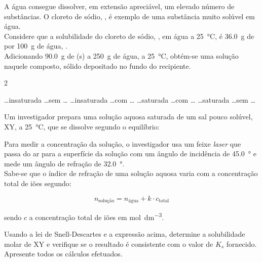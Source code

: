 \documentclass[addpoints, answers]{exam}
\begin{document}
\begin{questions}
		\question[8] A água consegue dissolver, em extensão apreciável, um elevado número de substâncias. O cloreto de sódio, , é exemplo de uma substância muito solúvel em água.\\
		
		Considere que a solubilidade do cloreto de sódio, , em água a \SI{25}{\celsius}, é \SI{36,0}{\gram} de  por \SI{100}{\gram} de água, .\\
		Adicionando \SI{90,0}{\gram} de (s) a \SI{250}{\gram} de água, a \SI{25}{\celsius}, obtém-se uma solução \underline{\hspace{50pt}} naquele composto, \underline{\hspace{50pt}} sólido depositado no fundo do recipiente.
		
		\begin{multicols}{2}
			\begin{randomizechoices}
				\choice \ldots insaturada \ldots sem \ldots
				\choice \ldots insaturada \ldots com \ldots
				\choice \ldots saturada \ldots com \ldots
				\correctchoice \ldots saturada \ldots sem \ldots
			\end{randomizechoices}
		\end{multicols}
		
		
		\question[16] Um investigador prepara uma solução aquosa saturada de um sal pouco solúvel, XY, a \SI{25}{\celsius}, que se dissolve segundo o equilíbrio:\\
		
		\begin{center}
		\end{center}
		
		Para medir a concentração da solução, o investigador usa um feixe \textit{laser} que passa do ar para a superfície da solução com um ângulo de incidência de \SI{45,0}{\degree} e mede um ângulo de refração de \SI{32,0}{\degree}.\\
		
		Sabe-se que o índice de refração de uma	solução aquosa varia com a concentração total de iões segundo:
		
		\[
		n_{\text{solução}} = n_{\text{água}} + k \cdot c_\text{total}
		\]
		
		sendo $c$ a concentração total de iões em \unit{\mole\per\cubic\deci\meter}.
		
		Usando a lei de Snell-Descartes e a expressão acima, determine a solubilidade molar de XY e verifique se o resultado é consistente com o valor de $K_s$ fornecido.\\
		Apresente todos os cálculos efetuados.
		

\end{questions}
\end{document}
